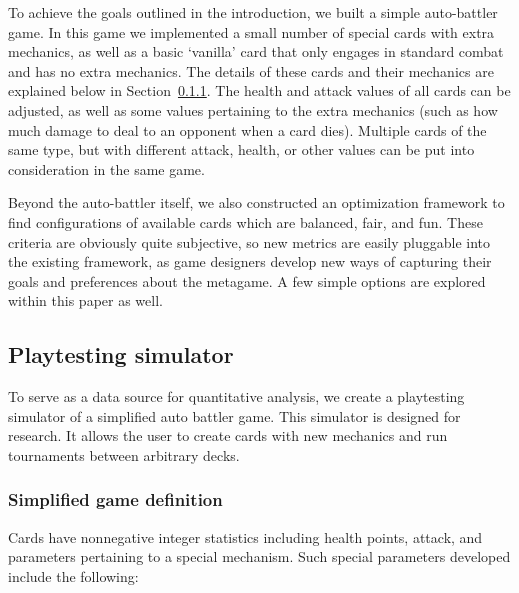 
To achieve the goals outlined in the introduction, we built a simple auto-battler game. In this game we implemented a small number of special cards with extra mechanics, as well as a basic `vanilla' card that only engages in standard combat and has no extra mechanics. The details of these cards and their mechanics are explained below in Section~\ref{sec:ab-game-def}. The health and attack values of all cards can be adjusted, as well as some values pertaining to the extra mechanics (such as how much damage to deal to an opponent when a card dies). Multiple cards of the same type, but with different attack, health, or other values can be put into consideration in the same game. 

Beyond the auto-battler itself, we also constructed an optimization framework to find configurations of available cards which are balanced, fair, and fun. These criteria are obviously quite subjective, so new metrics are easily pluggable into the existing framework, as game designers develop new ways of capturing their goals and preferences about the metagame. A few simple options are explored within this paper as well.

\subsection{Playtesting simulator}

To serve as a data source for quantitative analysis, we create
a playtesting simulator of a simplified auto battler game. 
This simulator is designed for research. It allows the user to 
create cards with new mechanics and run tournaments between
arbitrary decks. 

\subsubsection{Simplified game definition} \label{sec:ab-game-def}

Cards have nonnegative integer statistics including health points, 
attack, and parameters pertaining to a special mechanism. Such special parameters
developed include the following:

